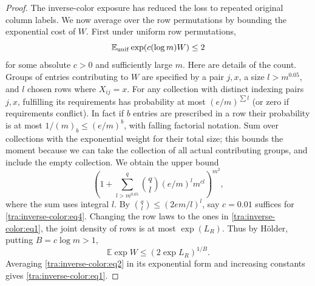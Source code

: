 \begin{proof}
The inverse-color exposure has reduced the loss to repeated original
column labels. We now average over the row permutations by bounding
the exponential cost of $W$. First under uniform row permutations,
\begin{equation}
                        {\mathbb E}_{\rm unif}\exp(c(\log m)W)\le 2              \label{tra:inverse-color:eq4}
\end{equation}
for some absolute \(c>0\) and sufficiently large \(m\). Here are details of the count. Groups of entries contributing to \(W\) are specified by a pair \(j,x\), a size \(l>m^{0.05}\), and \(l\) chosen rows where \(X_{ij}=x\). For any collection with distinct indexing pairs \(j,x\), fulfilling its requirements has probability at most \((e/m)^{\sum l}\) (or zero if requirements conflict). In fact if \(b\) entries are prescribed in a row their probability is at most \(1/(m)_b\le(e/m)^b\), with falling factorial notation. Sum over collections with the exponential weight for their total size; this bounds the moment because we can take the collection of all actual contributing groups, and include the empty collection. We obtain the upper bound
\[
                 \left(1+\sum_{l>m^{0.05}}^q
                   \binom ql(e/m)^l m^{cl}\right)^{m^2},
\]
where the sum uses integral \(l\). By \(\binom ql\le(2em/l)^l\), say \(c=0.01\) suffices for \eqref{tra:inverse-color:eq4}. Changing the row laws to the ones in \eqref{tra:inverse-color:eq1}, the joint density of rows is at most \(\exp(L_R)\). Thus by Hölder, putting \(B=c\log m>1\),
\[
                     \mathbb E\exp W\le (2\exp L_R)^{1/B}.
\]
Averaging \eqref{tra:inverse-color:eq2} in its exponential form and increasing constants gives \eqref{tra:inverse-color:eq1}.
\end{proof}
